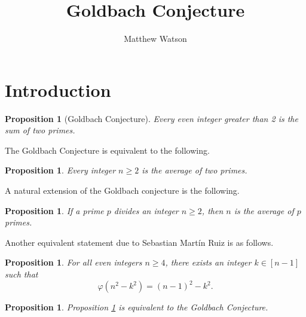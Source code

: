 \documentclass[12pt]{article}
\title{Goldbach Conjecture}
\author{Matthew Watson}
\newtheorem{proposition}[theorem]{Proposition}
\theoremstyle{definition}
\begin{document}
\section{Introduction}
\label{sec:intro}
\begin{proposition}[Goldbach Conjecture]
\label{prop:GC}
Every even integer greater than 2 is the sum of two primes.
\end{proposition}

The Goldbach Conjecture is equivalent to the following.

\begin{proposition}
Every integer $n \geq 2$ is the average of two primes.
\end{proposition}

A natural extension of the Goldbach conjecture is the following.

\begin{proposition}
If a prime $p$ divides an integer $n \geq 2$, then $n$ is the average of $p$ primes.
\end{proposition}


Another equivalent statement due to Sebastian Mart{\'i}n Ruiz is as follows.

\begin{proposition}
\label{prop:SMR}
For all even integers $n \geq 4$, there exists an integer $k \in [n-1]$ such that
\[
\varphi(n^2 - k^2) = (n-1)^2 - k^2.
\]
\end{proposition}

\begin{proposition}
Proposition \ref{prop:SMR} is equivalent to the Goldbach Conjecture.
\end{proposition}
\end{document}
